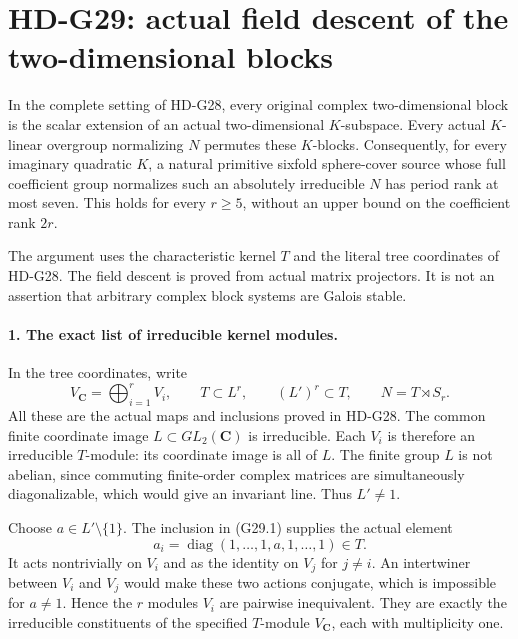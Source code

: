 \section{HD-G29: actual field descent of the two-dimensional blocks}
\label{sec:two-block-field-descent}

In the complete setting of HD-G28, every original complex
two-dimensional block is the scalar extension of an actual
two-dimensional \(K\)-subspace. Every actual \(K\)-linear
overgroup normalizing \(N\) permutes these \(K\)-blocks.
Consequently, for every imaginary quadratic \(K\), a natural
primitive sixfold sphere-cover source whose full coefficient
group normalizes such an absolutely irreducible \(N\) has
period rank at most seven. This holds for every \(r\ge5\),
without an upper bound on the coefficient rank \(2r\).

The argument uses the characteristic kernel \(T\) and the
literal tree coordinates of HD-G28. The field descent is proved
from actual matrix projectors. It is not an assertion that
arbitrary complex block systems are Galois stable.

\paragraph{1. The exact list of irreducible kernel modules.}
In the tree coordinates, write
\[
   V_{\mathbf C}=\bigoplus_{i=1}^rV_i,\qquad
   T\subset L^r,\qquad (L')^r\subset T,\qquad N=T\rtimes S_r.
                                                               \tag{G29.1}
\]
All these are the actual maps and inclusions proved in HD-G28.
The common finite coordinate image \(L\subset GL_2(\mathbf C)\)
is irreducible. Each \(V_i\) is therefore an irreducible
\(T\)-module: its coordinate image is all of \(L\).
The finite group \(L\) is not abelian, since commuting
finite-order complex matrices are simultaneously diagonalizable,
which would give an invariant line. Thus \(L'\ne1\).

Choose \(a\in L'\setminus\{1\}\). The inclusion in
(G29.1) supplies the actual element
\[
             a_i=\operatorname{diag}(1,\ldots,1,a,1,\ldots,1)
                         \in T.                            \tag{G29.2}
\]
It acts nontrivially on \(V_i\) and as the identity on
\(V_j\) for \(j\ne i\). An intertwiner between \(V_i\)
and \(V_j\) would make these two actions conjugate, which
is impossible for \(a\ne1\). Hence the \(r\) modules
\(V_i\) are pairwise inequivalent. They are exactly the
irreducible constituents of the specified \(T\)-module
\(V_{\mathbf C}\), each with multiplicity one.

